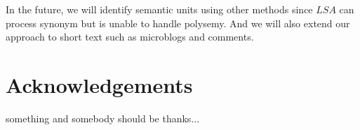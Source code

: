 \documentclass{llncs}
\begin{document}
In the future, we will identify semantic units using other methods since $LSA$ can process synonym but is unable to handle polysemy. And we will also extend our approach to short text such as microblogs and comments.

\section{Acknowledgements}
something and somebody should be thanks...





\end{document}
